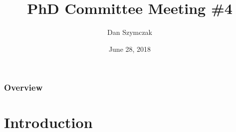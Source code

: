 \documentclass{beamer}
\title[\pgfuseimage{logo}]  %
{PhD Committee Meeting \#4}
\author[Slide \thepage~of \pageref{TotPages}] %
{Dan Szymczak}
\institute[McMaster University] %
{
  Computing and Software Department\\
  Faculty of Engineering\\
  McMaster University
}
\date[June 28, 2018] %
{June 28, 2018}
\begin{document}
\begin{frame}

\titlepage

\end{frame}


\begin{frame}

\frametitle{Overview}
\tableofcontents[pausesections]


\end{frame}


\section[Introduction]{Introduction}



%
%
%


%
%
%
\end{document}
